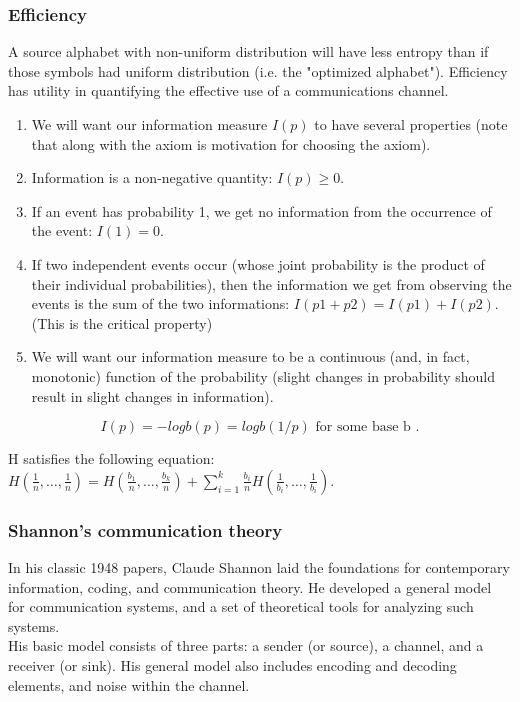 \begin{frame}
\frametitle{Efficiency}
A source alphabet with non-uniform distribution will have less entropy than if those symbols had uniform distribution (i.e. the "optimized alphabet"). 
Efficiency has utility in quantifying the effective use of a communications channel.
\end{frame}
\begin{frame}
\begin{enumerate}
\item We will want our information measure $I(p)$ to have several
properties (note that along with the axiom is motivation for
choosing the axiom). \item Information is a non-negative quantity:
$I(p) \geq 0$. \item If an event has probability 1, we get no
information from the occurrence of the event: $I(1) = 0$. \item If
two independent events occur (whose joint probability is the
product of their individual probabilities), then the information
we get from observing the events is the sum of the two
informations: $I(p1 + p2) = I(p1)+I(p2).$ (This is the critical
property)
\item We will want our information measure to be a continuous
(and, in fact, monotonic) function of the probability (slight
changes in probability should result in slight changes in
information).
\end{enumerate}
\begin{equation}
I(p) = -logb(p) = logb(1/p) \mbox{ for some base b }.
\end{equation}
\end{frame}
\begin{frame}
H satisfies the following equation: $ H\left(\frac{1}{n},
\ldots,\frac{1}{n}\right) = H\left(\frac{b_1}{n}, \ldots,
\frac{b_k}{n}\right) + \sum_{i=1}^k \frac{b_i}{n}
H\left(\frac{1}{b_i}, \ldots, \frac{1}{b_i}\right). $
\end{frame}
\begin{frame}
\frametitle{Shannon's communication theory }
In his classic 1948 papers, Claude Shannon laid the foundations
for contemporary information, coding, and communication theory. He
developed a general model for communication systems, and a set of
theoretical tools for analyzing such systems.\\
His basic model consists of three parts: a sender (or source), a
channel, and a receiver (or sink). His general model also includes
encoding and decoding elements, and noise within the channel.
\end{frame}

